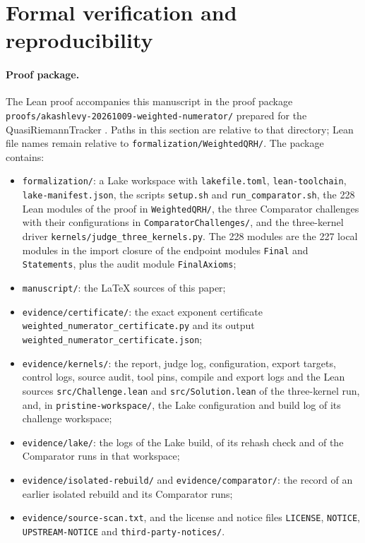 \documentclass[11pt]{article}
\begin{document}
\section{Formal verification and reproducibility}\label{sec:verification}

\begingroup
\raggedright
\paragraph{Proof package.}
The Lean proof accompanies this manuscript in the proof package
\nolinkurl{proofs/akashlevy-20261009-weighted-numerator/} prepared for
the QuasiRiemannTracker \cite{tracker}. Paths in this section are
relative to that directory; Lean file names remain relative to
\nolinkurl{formalization/WeightedQRH/}. The package contains:
\begin{itemize}
\item \nolinkurl{formalization/}: a Lake workspace with
\nolinkurl{lakefile.toml}, \nolinkurl{lean-toolchain},
\nolinkurl{lake-manifest.json}, the scripts \nolinkurl{setup.sh} and
\nolinkurl{run_comparator.sh}, the 228 Lean modules of the proof in
\nolinkurl{WeightedQRH/}, the three Comparator challenges with their
configurations in \nolinkurl{ComparatorChallenges/}, and the
three-kernel driver \nolinkurl{kernels/judge_three_kernels.py}. The 228
modules are the 227 local modules in the import closure of the endpoint
modules \nolinkurl{Final} and \nolinkurl{Statements}, plus the audit
module \nolinkurl{FinalAxioms};
\item \nolinkurl{manuscript/}: the \LaTeX{} sources of this paper;
\item \nolinkurl{evidence/certificate/}: the exact exponent certificate
\nolinkurl{weighted_numerator_certificate.py} and its output
\nolinkurl{weighted_numerator_certificate.json};
\item \nolinkurl{evidence/kernels/}: the report, judge log,
configuration, export targets, control logs, source audit, tool pins,
compile and export logs and the Lean sources \nolinkurl{src/Challenge.lean}
and \nolinkurl{src/Solution.lean} of the three-kernel run, and, in
\nolinkurl{pristine-workspace/}, the Lake configuration and build log of
its challenge workspace;
\item \nolinkurl{evidence/lake/}: the logs of the Lake build, of its
rehash check and of the Comparator runs in that workspace;
\item \nolinkurl{evidence/isolated-rebuild/} and
\nolinkurl{evidence/comparator/}: the record of an earlier isolated
rebuild and its Comparator runs;
\item \nolinkurl{evidence/source-scan.txt}, and the license and notice
files \nolinkurl{LICENSE}, \nolinkurl{NOTICE},
\nolinkurl{UPSTREAM-NOTICE} and \nolinkurl{third-party-notices/}.
\end{itemize}
\end{document}
